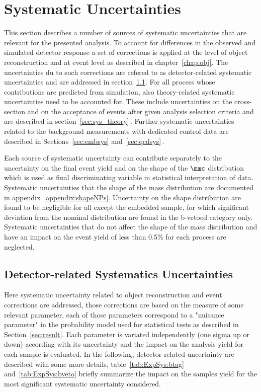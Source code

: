 \section{Systematic Uncertainties}
\label{sec:Systematics}

This section describes a number of sources of systematic uncertainties
that are relevant for the presented  analysis. To account for differences in the observed and simulated 
detector response a set of corrections is applied at the level of object reconstruction  
and at event level as described in chapter~\ref{chap:obj}. 
The uncertainties du to such corrections are refered to as detector-related systematic 
uncertainties and are addressed in section~\ref{sec:sys:sys_det}. 
For all process whose contributions are predicted from simulation, also theory-related
systematic uncertainties need to be accounted for. These include uncertainties on the cross-section and
 on the acceptance of events after given analysis selection criteria and 
are  described in section~\ref{sec:sys_theory}$\,.$
Further systematic uncertainties related to the background measurements with dedicated control data 
are described in Sections~\ref{sec:embsys} and~\ref{sec:qcdsys}$\,.$

Each source of systematic uncertainty can contribute separately to the uncertainty on the
final event yield and on the shape of the $\mmc$
distribution which is used as final discriminating variable in statistical interpretation of data. Systematic uncertainties
that the shape of the mass distribution are
documented in appendix~\ref{appendix:shapeNPs}. Uncertainty on the \mmc shape distribution 
are found to be negligible for all except the embedded sample, for which significant 
deviation from the nominal distribution are found in the b-vetoed category only. 
Systematic uncertainties that do not affect the
shape of the mass distribution and have an impact on the event yield of less than 0.5\% for each process are 
neglected.


\subsection{Detector-related Systematics Uncertainties}
\label{sec:sys:sys_det}
Here systematic uncertainty related to object reconstruction and event 
corrections are addressed, those corrections are based on the measure of some relevant parameter, 
each of those parameters correspond to a "nuisance parameter" in the probability model used for statistical tests
as described in Section~\ref{sec:result}.
Each parameter is variated independently (one sigma up or down) according with its 
uncertainty and the impact on the analysis yield for each sample is evaluated.
In the following, detector related uncertainty are  described with some more details,
table~\ref{tab:ExpSys:btag} and~\ref{tab:ExpSys:bveto} briefly summarize the impact on the samples 
yield for the most significant systematic uncertainty considered. 


